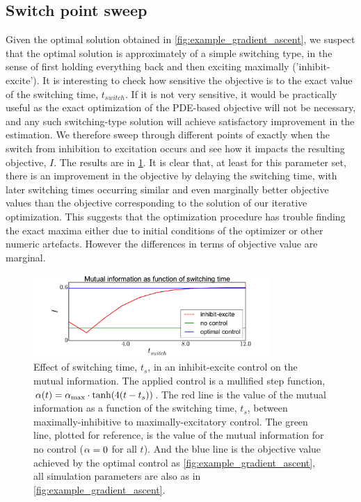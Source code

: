 \documentclass[12pt]{article}
\begin{document}
\subsection{Switch point sweep} 
Given the optimal solution obtained in \cref{fig:example_gradient_ascent}, we
suspect that the optimal solution is approximately of a simple switching type,
in the sense of first holding everything back and then exciting maximally
('inhibit-excite'). It is interesting to check how sensitive the objective is to
the exact value of the switching time, $t_{switch}$. If it is not very
sensitive, it would be practically useful as the exact optimization of the
PDE-based objective will not be necessary, and any such switching-type solution
will achieve satisfactory improvement in the estimation. We therefore sweep
through different points of exactly when the switch from inhibition to
excitation occurs and see how it impacts the resulting objective, $I$. The
results are in \cref{fig:sweep_switchtime}. It is clear that, at least for this
parameter set, there is an improvement in the objective by delaying the
switching time, with later switching times occurring similar and even
marginally better objective values than the objective corresponding to
the solution of our iterative optimization. This suggests that the
optimization procedure has trouble finding the exact maxima either due to
initial conditions of the optimizer or other numeric artefacts. However the
differences in terms of objective value are marginal.  

\begin{figure}[htp]
\begin{center}
  \includegraphics[width=0.8\textwidth]{Figs/AdjointOptimizer/SweepSwitchpoint_wide_benchmarked.pdf}
  \caption[Effect of Switching time on Mutual Info Objective]{Effect of 
  switching time, $t_s$, in an inhibit-excite control on the mutual
  information. The applied control is a mullified step function, ${\alpha}(t)
  = { {\alpha}_{\textrm{max}} }\cdot \tanh(4(t-t_s))$. 
  The red line is the value of the mutual
  information as a function of the switching time, $t_s$, between
  maximally-inhibitive to maximally-excitatory control. 
  The green line, plotted for reference, is the
  value of the mutual information for no control (${\alpha}=0$ for all $t$).  
  And the blue line is the objective value achieved by the optimal control as \cref{fig:example_gradient_ascent}, all simulation parameters are also as in \cref{fig:example_gradient_ascent}.
   }
  \label{fig:sweep_switchtime} 
\end{center}
\end{figure}
\end{document}
